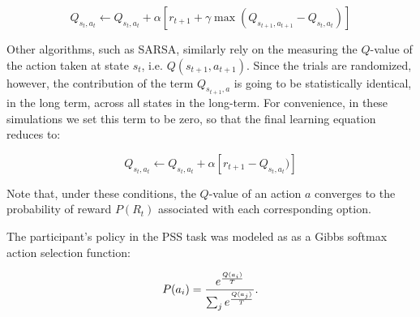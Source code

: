 \documentclass[10pt,letterpaper]{article}
\begin{document}
\begin{equation}
Q_{s_t,a_t} \leftarrow Q_{s_t,a_t} + \alpha [r_{t+1} + \gamma \max(Q_{s_{t+1}, a_{t+1}} - Q_{s_t,a_t})]
\end{equation}

Other algorithms, such as SARSA, similarly rely on the measuring the $Q$-value of the action taken at state $s_t$, i.e. $Q(s_{t+1}, a_{t+1})$. Since the trials are randomized, however, the contribution of the term $Q_{s_{t+1}, a}$ is going to be statistically identical, in the long term, across all states in the long-term. For convenience, in these simulations we set this term to be zero, so that the final learning equation reduces to:

\begin{equation}
Q_{s_t,a_t} \leftarrow Q_{s_t,a_t} + \alpha [r_{t+1} - Q_{s_t,a_t})]
\end{equation}

Note that, under these conditions, the $Q$-value of an action $a$ converges to the probability of reward $P(R_t)$ associated with each corresponding option.



{\color{red} The participant's policy in the PSS task was modeled as as a Gibbs softmax action selection function:}

\begin{equation}
P(a_i) = \frac{e^{\frac{Q(a_i)}{T}}}{\sum_{j} e^{\frac{Q(a_j)}{T}}}\\.
\end{equation}
\end{document}
